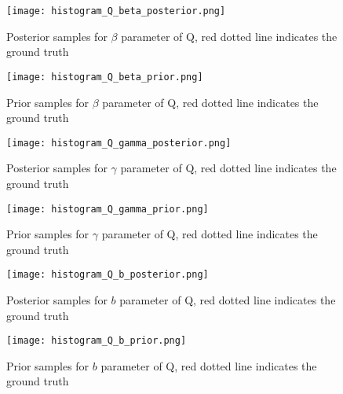 \begin{figure}[h]
\vspace{.3in}
\centerline{\texttt{[image: histogram\_Q\_beta\_posterior.png]}}
\vspace{.3in}
\caption{Posterior samples for $\beta$ parameter of Q, red dotted line indicates the ground truth}
\label{fig:beta}
\end{figure}

\begin{figure}[h]
\vspace{.3in}
\centerline{\texttt{[image: histogram\_Q\_beta\_prior.png]}}
\vspace{.3in}
\caption{Prior samples for $\beta$ parameter of Q, red dotted line indicates the ground truth}
\label{fig:betaprior}
\end{figure}

\begin{figure}[h]
\vspace{.3in}
\centerline{\texttt{[image: histogram\_Q\_gamma\_posterior.png]}}
\vspace{.3in}
\caption{Posterior samples for $\gamma$ parameter of Q, red dotted line indicates the ground truth}
\label{fig:gamma}
\end{figure}

\begin{figure}[h]
\vspace{.3in}
\centerline{\texttt{[image: histogram\_Q\_gamma\_prior.png]}}
\vspace{.3in}
\caption{Prior samples for $\gamma$ parameter of Q, red dotted line indicates the ground truth}
\label{fig:gammaprior}
\end{figure}


\begin{figure}[h]
\vspace{.3in}
\centerline{\texttt{[image: histogram\_Q\_b\_posterior.png]}}
\vspace{.3in}
\caption{Posterior samples for $b$ parameter of Q, red dotted line indicates the ground truth}
\label{fig:b}
\end{figure}

\begin{figure}[h]
\vspace{.3in}
\centerline{\texttt{[image: histogram\_Q\_b\_prior.png]}}
\vspace{.3in}
\caption{Prior samples for $b$ parameter of Q, red dotted line indicates the ground truth}
\label{fig:bprior}
\end{figure}

%
%
